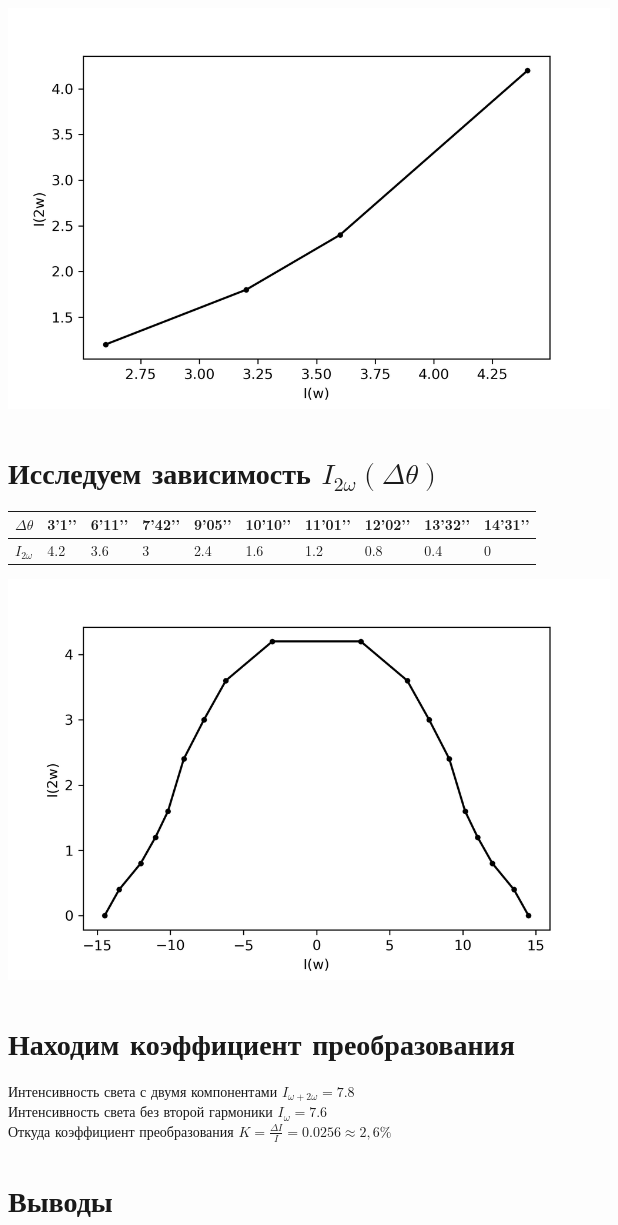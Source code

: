 \documentclass[a4paper,14pt]{article} %
\begin{document}
\begin{center}
\includegraphics[width = 0.7\textwidth]{images/plot_1}
\end{center}

\section{Исследуем зависимость $I_{2\omega} (\Delta \theta)$}

\begin{table}[H]
\begin{tabular}{|l|l|l|l|l|l|l|l|l|l|}
\hline
$\Delta \theta$ & 3’1’’ & 6’11’’ & 7’42’’ & 9’05’’ & 10’10’’ & 11’01’’ & 12’02’’ & 13’32’’ & 14’31’’ \\ \hline
$I_{2 \omega}$           & 4.2   & 3.6    & 3      & 2.4    & 1.6     & 1.2     & 0.8     & 0.4     & 0       \\ \hline
\end{tabular}
\end{table}

\begin{center}
\includegraphics[width = 0.7\textwidth]{images/plot_2}
\end{center}

\section{Находим коэффициент преобразования}
Интенсивность света с двумя компонентами $I_{\omega + 2 \omega} = 7.8$\\
Интенсивность света без второй гармоники $I_{\omega} = 7.6$\\
Откуда коэффициент преобразования   $K = \frac{\Delta I}{I} = 0.0256 \approx 2,6 \%$\\

\section{Выводы}
\end{document}
